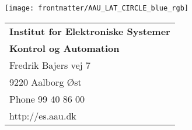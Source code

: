 \thispagestyle{empty}
\noindent
\begin{minipage}[l]{0.50\textwidth}
	\centering
	\texttt{[image: frontmatter/AAU\_LAT\_CIRCLE\_blue\_rgb]}
\end{minipage}
\begin{minipage}[r]{0.50\textwidth}

\noindent
	\begin{tabular}{l}
		{\textsf{\small \textbf{Institut for Elektroniske Systemer}}}\\
		{\textsf{\small \textbf{Kontrol og Automation}}} \\
		{\textsf{\small Fredrik Bajers vej 7}} \\
		{\textsf{\small 9220 Aalborg \O st}} \\
		{\textsf{\small Phone 99 40 86 00}} \\
		{\textsf{\small http://es.aau.dk}}
	\end{tabular}
\end{minipage}


